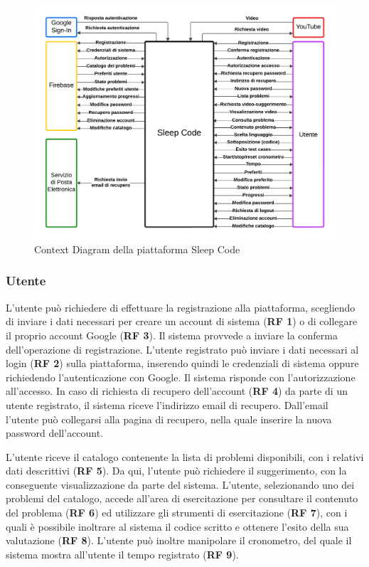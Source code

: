 \documentclass[11pt, a4paper]{article}
\theoremstyle{definition} %
\begin{document}
\begin{figure}[H]
\centering
\hspace*{-2.6cm}
\includegraphics[scale=0.7]{materiale/contextdiagram.pdf}
\caption{Context Diagram della piattaforma Sleep Code}
\label{contextdiagram}
\end{figure}

\subsubsection*{Utente}
L'utente può richiedere di effettuare la registrazione alla piattaforma,
scegliendo di inviare i dati necessari per creare un
account di sistema (\textbf{RF 1}) o di collegare il proprio account Google (\textbf{RF 3}). Il sistema
provvede a inviare la conferma dell'operazione di registrazione.
L'utente registrato può inviare i dati necessari al login (\textbf{RF 2}) sulla piattaforma,
inserendo quindi le credenziali di sistema oppure richiedendo l'autenticazione
con Google. Il sistema risponde con l'autorizzazione all'accesso.
In caso di richiesta di recupero dell'account (\textbf{RF 4}) da parte di un utente
registrato, il sistema riceve l'indirizzo email di recupero. Dall'email
l'utente può collegarsi alla pagina di recupero, nella quale inserire la
nuova password dell'account.

L'utente riceve il catalogo contenente la lista di problemi disponibili,
con i relativi dati descrittivi (\textbf{RF 5}). Da qui, l'utente può
richiedere il suggerimento, con la conseguente visualizzazione da parte del
sistema. L'utente, selezionando uno dei problemi del catalogo, accede
all'area di esercitazione per consultare il contenuto del problema (\textbf{RF 6})
ed utilizzare gli strumenti di esercitazione (\textbf{RF 7}), con i quali
è possibile inoltrare al sistema il codice scritto e ottenere l'esito della
sua valutazione (\textbf{RF 8}). L'utente può inoltre manipolare il cronometro,
del quale il sistema mostra all'utente il tempo registrato (\textbf{RF 9}).
\end{document}
